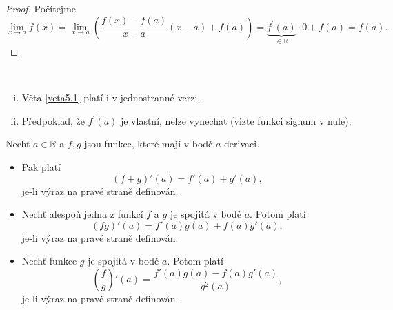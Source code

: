 \begin{proof}
	Počítejme
    $$
	\lim_{x\to a} f(x) = \lim_{x\to a} \left( \frac{f(x)-f(a)}{x-a}(x-a)+f(a) \right ) =\underbrace{f^\prime(a)}_{\in \mathbb R }\cdot 0+f(a)=f(a).
	$$
\end{proof}

\begin{poznamka}\,
\begin{enumerate}[(i)]
	\item Věta \ref{veta5.1} platí i v jednostranné verzi.
	\item Předpoklad, že $f^\prime(a)$ je vlastní, nelze vynechat (vizte funkci signum v nule).
\end{enumerate}
\end{poznamka}

\begin{veta}\label{veta5.2}
Nechť $a \in \mathbb{R}$ a $f, g$ jsou funkce, které mají v bodě $a$ derivaci.
\begin{itemize}
\item[(a)] Pak platí $$(f+g)'(a)=f'(a)+g'(a),$$ je-li výraz na pravé straně definován.
\item[(b)] Nechť alespoň jedna z funkcí $f$ a $g$ je spojitá v bodě $a$.
Potom platí $$(fg)'(a)=f'(a)g(a)+f(a)g'(a),$$
je-li výraz na pravé straně definován.
\item[(c)] Nechť funkce $g$ je spojitá v bodě $a$. Potom platí
$$
\left(\frac{f}{g}\right)'(a)=\frac{f'(a)g(a)-f(a)g'(a)}{g^2(a)},$$
je-li výraz na pravé straně definován.
\end{itemize}
\end{veta}

